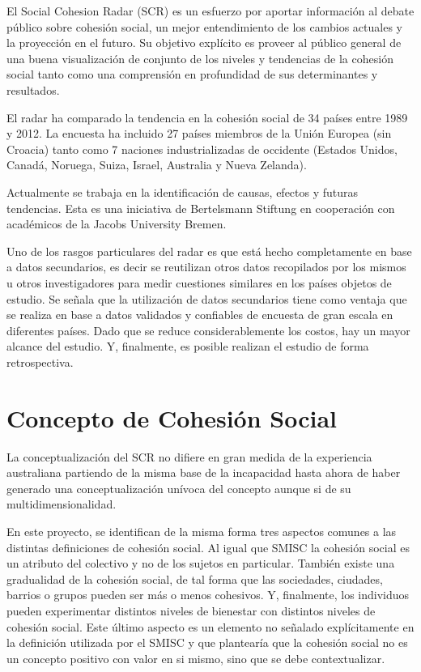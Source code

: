 \documentclass[
  12pt,
]{book}
\begin{document}
El Social Cohesion Radar (SCR) es un esfuerzo por aportar información al
debate público sobre cohesión social, un mejor entendimiento de los
cambios actuales y la proyección en el futuro. Su objetivo explícito es
proveer al público general de una buena visualización de conjunto de los
niveles y tendencias de la cohesión social tanto como una comprensión en
profundidad de sus determinantes y resultados.

El radar ha comparado la tendencia en la cohesión social de 34 países
entre 1989 y 2012. La encuesta ha incluido 27 países miembros de la
Unión Europea (sin Croacia) tanto como 7 naciones industrializadas de
occidente (Estados Unidos, Canadá, Noruega, Suiza, Israel, Australia y
Nueva Zelanda).

Actualmente se trabaja en la identificación de causas, efectos y futuras
tendencias. Esta es una iniciativa de Bertelsmann Stiftung en
cooperación con académicos de la Jacobs University Bremen.

Uno de los rasgos particulares del radar es que está hecho completamente
en base a datos secundarios, es decir se reutilizan otros datos
recopilados por los mismos u otros investigadores para medir cuestiones
similares en los países objetos de estudio. Se señala que la utilización
de datos secundarios tiene como ventaja que se realiza en base a datos
validados y confiables de encuesta de gran escala en diferentes países.
Dado que se reduce considerablemente los costos, hay un mayor alcance
del estudio. Y, finalmente, es posible realizan el estudio de forma
retrospectiva.

\hypertarget{concepto-de-cohesiuxf3n-social-2}{%
\section{Concepto de Cohesión Social}\label{concepto-de-cohesiuxf3n-social-2}}

La conceptualización del SCR no difiere en gran medida de la experiencia
australiana partiendo de la misma base de la incapacidad hasta ahora de
haber generado una conceptualización unívoca del concepto aunque si de
su multidimensionalidad.

En este proyecto, se identifican de la misma forma tres aspectos comunes
a las distintas definiciones de cohesión social. Al igual que SMISC la
cohesión social es un atributo del colectivo y no de los sujetos en
particular. También existe una gradualidad de la cohesión social, de tal
forma que las sociedades, ciudades, barrios o grupos pueden ser más o
menos cohesivos. Y, finalmente, los individuos pueden experimentar
distintos niveles de bienestar con distintos niveles de cohesión social.
Este último aspecto es un elemento no señalado explícitamente en la
definición utilizada por el SMISC y que plantearía que la cohesión
social no es un concepto positivo con valor en si mismo, sino que se
debe contextualizar.
\end{document}
